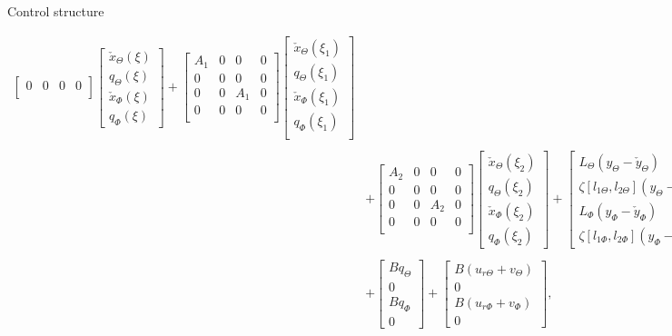 \documentclass{beamer}
\begin{document}
\begin{frame}{Control structure}
\begin{itemize}
\begin{align*}
\begin{bmatrix}
		0 & 0 & 0 & 0 \\
		\end{bmatrix}
		\begin{bmatrix}
		\check{x}_\Theta(\xi) \\
		q_\Theta(\xi) \\
		\check{x}_\Phi(\xi) \\
		q_\Phi (\xi)
		\end{bmatrix} + 
		\begin{bmatrix}
		A_1 & 0 & 0 & 0\\
		0 & 0 & 0 & 0\\
		0 & 0 & A_1 & 0 \\
		0 & 0 & 0 & 0 \\
		\end{bmatrix}
		\begin{bmatrix}
		\check{x}_\Theta(\xi_1) \\
		q_\Theta(\xi_1) \\
		\check{x}_\Phi(\xi_1) \\
		q_\Phi(\xi_1) \\
		\end{bmatrix} \nonumber\\
		\nonumber\\
		&+
		\begin{bmatrix}
		A_2 & 0 & 0 & 0\\
		0 & 0 & 0 & 0\\
		0 & 0 & A_2 & 0 \\
		0 & 0 & 0 & 0 \\
		\end{bmatrix}
		\begin{bmatrix}
		\check{x}_\Theta(\xi_2) \\
		q_\Theta(\xi_2) \\
		\check{x}_\Phi(\xi_2) \\
		q_\Phi(\xi_2) 
		\end{bmatrix} +
		\begin{bmatrix}
		L_\Theta(y_{\Theta} - \check{y}_{\Theta})\\
		\zeta[l_{1\Theta},l_{2\Theta}](y_\Theta - \check{y}_\Theta) \\
		L_{\Phi}(y_{\Phi} - \check{y}_{\Phi}) \\
		\zeta[l_{1\Phi},l_{2{\Phi}}](y_\Phi - \check{y}_\Phi)
		\end{bmatrix} \\
		\\
		&+
		\begin{bmatrix}
		Bq_\Theta \\
		0 \\
		Bq_\Phi \\
		0	
		\end{bmatrix} +
		\begin{bmatrix}
		B(u_{r\Theta} + v_\Theta)\\
		0 \\
		B(u_{r\Phi} + v_\Phi) \\
		0
		\end{bmatrix},\label{eq:Observer}
\end{align*}	
\end{itemize}
\end{frame}
\end{document}

